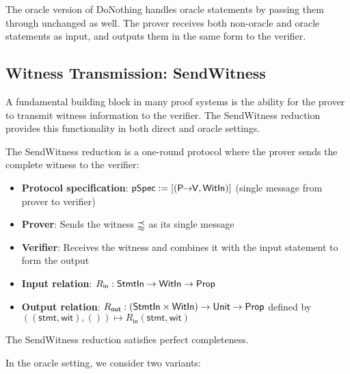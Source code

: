The oracle version of DoNothing handles oracle statements by passing them through unchanged as well. The prover receives both non-oracle and oracle statements as input, and outputs them in the same form to the verifier.

\subsection{Witness Transmission: SendWitness}

A fundamental building block in many proof systems is the ability for the prover to transmit witness information to the verifier. The SendWitness reduction provides this functionality in both direct and oracle settings.

\begin{definition}
    \label{def:sendwitness_reduction}
    The SendWitness reduction is a one-round protocol where the prover sends the complete witness to the verifier:
    \begin{itemize}
        \item \textbf{Protocol specification}: $\pSpec := [(\PtoVdir, \WitIn)]$ (single message from prover to verifier)
        \item \textbf{Prover}: Sends the witness $\mathbbm{w}$ as its single message
        \item \textbf{Verifier}: Receives the witness and combines it with the input statement to form the output
        \item \textbf{Input relation}: $R_{\mathsf{in}} : \StmtIn \to \WitIn \to \Prop$
        \item \textbf{Output relation}: $R_{\mathsf{out}} : (\StmtIn \times \WitIn) \to \Unit \to \Prop$ defined by $((\mathsf{stmt}, \mathsf{wit}), ()) \mapsto R_{\mathsf{in}}(\mathsf{stmt}, \mathsf{wit})$
    \end{itemize}
\end{definition}

\begin{theorem}
    The SendWitness reduction satisfies perfect completeness.
\end{theorem}

In the oracle setting, we consider two variants:

